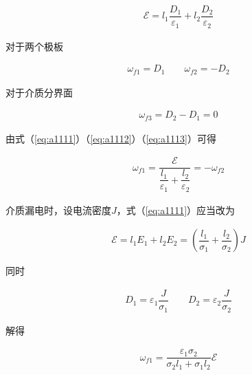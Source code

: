 \documentclass{article}
\begin{document}
\begin{equation}
  \label{eq:a1111}
  \begin{aligned}
    \mathcal{E} = l_1 \dfrac{D_1}{\varepsilon_1} + l_2 \dfrac{D_2}{\varepsilon_2}   
  \end{aligned}
\end{equation}

对于两个极板

\begin{equation}
  \label{eq:a1112}
  \begin{aligned}
    \omega_{f1} = D_1
    \quad\quad
    \omega_{f2} = - D_2
  \end{aligned}
\end{equation}

对于介质分界面

\begin{equation}
  \label{eq:a1113}
  \begin{aligned}
    \omega_{f3} = D_2 - D_1 = 0
  \end{aligned}
\end{equation}

由式（\ref{eq:a1111}）（\ref{eq:a1112}）（\ref{eq:a1113}）可得

\begin{equation*}
  \begin{aligned}
    \omega_{f1} = \dfrac{\mathcal{E}}{\dfrac{l_1}{\varepsilon_1} + \dfrac{l_2}{\varepsilon_2}  } = - \omega_{f2} 
  \end{aligned}
\end{equation*}

介质漏电时，设电流密度$J$，式（\ref{eq:a1111}）应当改为

\begin{equation*}
  \begin{aligned}
    \mathcal{E} = l_1 E_1 + l_2 E_2 = \left( \dfrac{l_1}{\sigma_1} + \dfrac{l_2}{\sigma_2}   \right) J
  \end{aligned}
\end{equation*}

同时

\begin{equation*}
  \begin{aligned}
    D_1 = \varepsilon_1 \dfrac{J}{\sigma_1}
    \quad\quad
    D_2 = \varepsilon_2 \dfrac{J}{\sigma_2}  
  \end{aligned}
\end{equation*}

解得

\begin{equation*}
  \begin{aligned}
    \omega_{f1} = \dfrac{\varepsilon_1 \sigma_2}{\sigma_2 l_1 + \sigma_1 l_2} \mathcal{E}
  \end{aligned}
\end{equation*}
\end{document}
